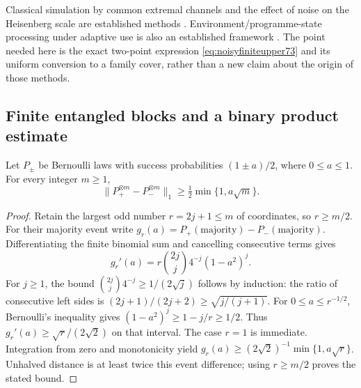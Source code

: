 Classical simulation by common extremal channels and the effect of
noise on the Heisenberg scale are established methods
\cite{DKG67}. Environment/programme-state processing under adaptive
use is also an established framework \cite{DW72,WBHK72,WW72}.
The point needed here is the exact two-point expression
\eqref{eq:noisyfiniteupper73} and its uniform conversion to a family
cover, rather than a new claim about the origin of those methods.

\subsection{Finite entangled blocks and a binary product estimate}
\begin{lemma}\label{lem:bernoullimajority73}
Let $P_\pm$ be Bernoulli laws with success probabilities
$(1\pm a)/2$, where $0\le a\le1$. For every integer $m\ge1$,
\begin{equation}\label{eq:bernoullimajority73}
 \|P_+^{\otimes m}-P_-^{\otimes m}\|_1
                   \ge\tfrac12\min\{1,a\sqrt m\}.
\end{equation}
\end{lemma}
\begin{proof}
Retain the largest odd number $r=2j+1\le m$ of coordinates, so
$r\ge m/2$. For their majority event write
$g_r(a)=P_+(\text{majority})-P_-(\text{majority})$.
Differentiating the finite binomial sum and cancelling consecutive
terms gives
\[
 g_r'(a)=r\binom{2j}{j}4^{-j}(1-a^2)^j.
\]
For $j\ge1$, the bound $\binom{2j}{j}4^{-j}\ge1/(2\sqrt j)$
follows by induction: the ratio of consecutive left sides is
$(2j+1)/(2j+2)\ge\sqrt{j/(j+1)}$. For
$0\le a\le r^{-1/2}$, Bernoulli's inequality gives
$(1-a^2)^j\ge1-j/r\ge1/2$. Thus
$g_r'(a)\ge\sqrt r/(2\sqrt2)$ on that interval. The case $r=1$
is immediate. Integration from zero and monotonicity yield
$g_r(a)\ge(2\sqrt2)^{-1}\min\{1,a\sqrt r\}$.
Unhalved distance is at least twice this event difference; using
$r\ge m/2$ proves the stated bound.
\end{proof}

